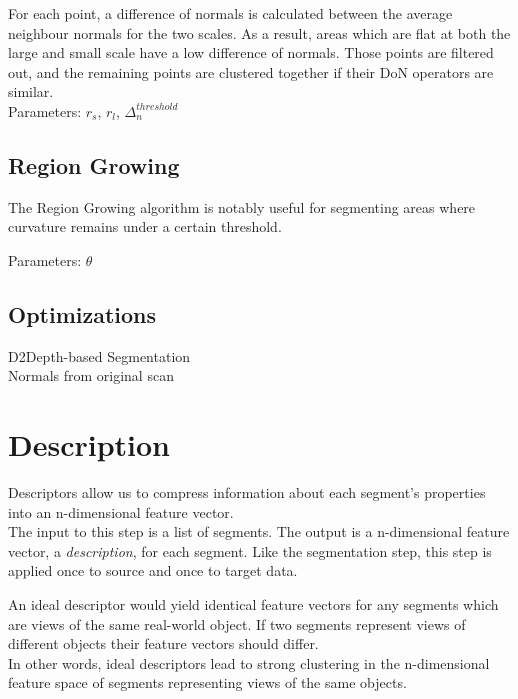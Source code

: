 For each point, a difference of normals is calculated between the average neighbour normals for the two scales. As a result, areas which are flat at both the large and small scale have a low difference of normals. Those points are filtered out, and the remaining points are clustered together if their DoN operators are similar.\\

Parameters: $r_s$, $r_l$, $\Delta_n^{threshold}$

\subsection{Region Growing}
\label{subsec:region-growing}

The Region Growing algorithm is notably useful for segmenting areas where curvature remains under a certain threshold.

Parameters: $\theta$

\subsection{Optimizations}
\label{subsec:optimizations}

D2Depth-based Segmentation\\
Normals from original scan

\section{Description}
\label{sec:description}

Descriptors allow us to compress information about each segment's properties into an n-dimensional feature vector.\\

The input to this step is a list of segments. The output is a n-dimensional feature vector, a \textit{description}, for each segment. Like the segmentation step, this step is applied once to source and once to target data.

An ideal descriptor would yield identical feature vectors for any segments which are views of the same real-world object. If two segments represent views of different objects their feature vectors should differ.\\

In other words, ideal descriptors lead to strong clustering in the n-dimensional feature space of segments representing views of the same objects. \\


